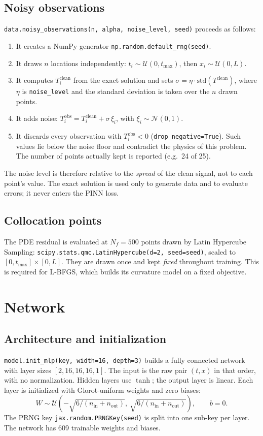 \documentclass[10pt]{article}
\newcommand{\code}[1]{\texttt{#1}}
\begin{document}
\subsection{Noisy observations}
\code{data.noisy\_observations(n, alpha, noise\_level, seed)} proceeds as follows:
\begin{enumerate}
\item It creates a NumPy generator \code{np.random.default\_rng(seed)}.
\item It draws $n$ locations independently: $t_i\sim\mathcal{U}(0,t_{\max})$, then $x_i\sim\mathcal{U}(0,L)$.
\item It computes $T_i^{\text{clean}}$ from the exact solution and sets $\sigma=\eta\cdot\mathrm{std}(T^{\text{clean}})$, where $\eta$ is \code{noise\_level} and the standard deviation is taken over the $n$ drawn points.
\item It adds noise: $T_i^{\text{obs}}=T_i^{\text{clean}}+\sigma\,\xi_i$, with $\xi_i\sim\mathcal{N}(0,1)$.
\item It discards every observation with $T_i^{\text{obs}}<0$ (\code{drop\_negative=True}). Such values lie below the noise floor and contradict the physics of this problem. The number of points actually kept is reported (e.g.\ 24 of 25).
\end{enumerate}
The noise level is therefore relative to the \emph{spread} of the clean signal, not to each point's value. The exact solution is used only to generate data and to evaluate errors; it never enters the PINN loss.

\subsection{Collocation points}
The PDE residual is evaluated at $N_f=500$ points drawn by Latin Hypercube Sampling:
\code{scipy.stats.qmc.LatinHypercube(d=2, seed=seed)}, scaled to $[0,t_{\max}]\times[0,L]$. They are drawn once and kept \emph{fixed} throughout training. This is required for L-BFGS, which builds its curvature model on a fixed objective.

\section{Network}

\subsection{Architecture and initialization}
\code{model.init\_mlp(key, width=16, depth=3)} builds a fully connected network with layer sizes $[2,16,16,16,1]$. The input is the raw pair $(t,x)$ in that order, with no normalization. Hidden layers use $\tanh$; the output layer is linear. Each layer is initialized with Glorot-uniform weights and zero biases:
\begin{equation}
W\sim\mathcal{U}\!\left(-\sqrt{6/(n_{\text{in}}+n_{\text{out}})},\ \sqrt{6/(n_{\text{in}}+n_{\text{out}})}\right),\qquad b=0 .
\end{equation}
The PRNG key \code{jax.random.PRNGKey(seed)} is split into one sub-key per layer. The network has 609 trainable weights and biases.
\end{document}
